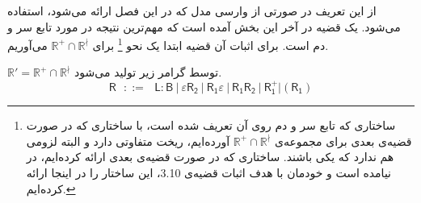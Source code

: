 از این تعریف در صورتی از وارسی مدل که در این فصل ارائه می‌شود، استفاده می‌شود. یک قضیه در آخر این بخش آمده است که مهم‌ترین نتیجه در مورد تابع سر و دم است. 
برای اثبات آن قضیه ابتدا یک نحو
\footnote{
ساختاری که تابع سر و دم روی آن تعریف شده است، با ساختاری که در صورت قضیه‌ی بعدی برای مجموعه‌ی 
$\mathbb{R}^+ \cap \mathbb{R}^\nmid$ 
آورده‌ایم،
 ریخت متفاوتی دارد و البته لزومی هم ندارد که یکی باشند. ساختاری که در صورت قضیه‌ی بعدی ارائه کرده‌ایم، در \cite{calcul} نیامده است و خودمان با هدف اثبات قضیه‌ی 3.10، این ساختار را در اینجا ارائه‌ کرده‌ایم.
}
 برای $\mathbb{R^+ \cap R^\nmid}$ می‌آوریم.
\begin{thm}
	$\mathbb{R'=R^+ \cap R^\nmid}$ توسط گرامر زیر تولید می‌شود.
	$$\mathsf{R}\:\:\: ::= \:\:\: \mathsf{L:B} \: |
	\: \mathsf{\varepsilon R_2} \: | \: \mathsf{R_1 \varepsilon} \: |
	\: \mathsf{R_1 R_2} \: | 
	\: \mathsf{R_1^+} | (\mathsf{R_1})$$
\end{thm}

